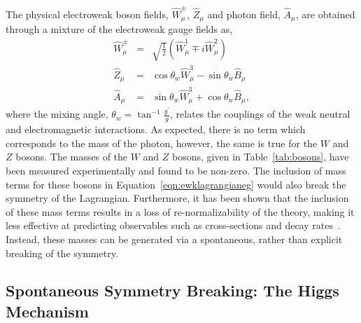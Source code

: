 The physical electroweak boson fields, $\hat{W}_{\mu}^{\pm}$, $\hat{Z}_{\mu}$ and photon field, 
$\hat{A}_{\mu}$, are obtained through a mixture of the electroweak gauge fields as,
\begin{eqnarray}
\hat{W}_{\mu}^{\pm} & = &  \sqrt{\frac{1}{2}} \left( \hat{W}_{\mu}^{1} \mp i \hat{W}_{\mu}^{2} \right) \nonumber \\
\hat{Z}_{\mu} &  = & \cos\theta_{w} \hat{W}_{\mu}^{3} - \sin\theta_{w} \hat{B}_{\mu} \nonumber \\
\hat{A}_{\mu} &  = & \sin\theta_{w} \hat{W}_{\mu}^{3} + \cos\theta_{w} \hat{B}_{\mu},
\label{eqn:ewkbosons}
\end{eqnarray}
where the mixing angle, $\theta_{w} = \tan^{-1}{\frac{g^{\prime}}{g}}$, relates
the couplings of the weak neutral and electromagnetic interactions.
As expected, there is no term which corresponds to the mass of the photon, however,
the same is true for the $W$ and $Z$ bosons. The masses of the $W$ and $Z$ bosons, 
given in Table~\ref{tab:bosons}, have been measured experimentally and found to be 
non-zero. The inclusion of mass terms for these bosons in Equation~\ref{eqn:ewklagrangianeg} 
would also break the symmetry of the Lagrangian. Furthermore, it has been shown that the inclusion
of these mass terms results in a loss of re-normalizability of the theory, making it  
less effective at predicting observables such as cross-sections and decay rates~\citep{halzen}.
Instead, these masses can be generated via a spontaneous, rather than explicit
breaking of the symmetry.

\subsection{Spontaneous Symmetry Breaking: The Higgs Mechanism}

